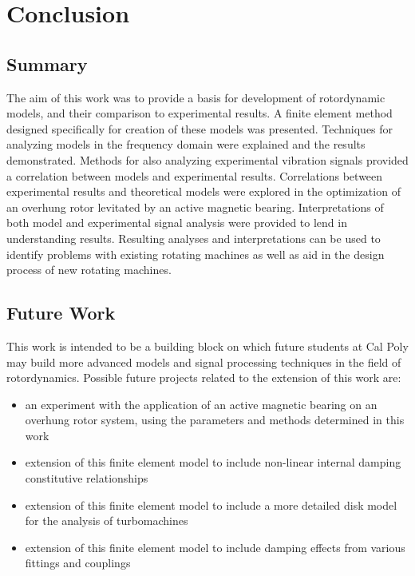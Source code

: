 \chapter{Conclusion}\label{conclusion}
\section{Summary}
The aim of this work was to provide a basis for development of rotordynamic models, and their comparison to experimental results. A finite element method designed specifically for creation of these models was presented. Techniques for analyzing models in the frequency domain were explained and the results demonstrated. Methods for also analyzing experimental vibration signals provided a correlation between models and experimental results. Correlations between experimental results and theoretical models were explored in the optimization of an overhung rotor levitated by an active magnetic bearing. Interpretations of both model and experimental signal analysis were provided to lend in understanding results. Resulting analyses and interpretations can be used to identify problems with existing rotating machines as well as aid in the design process of new rotating machines.\par
\section{Future Work}
This work is intended to be a building block on which future students at Cal Poly may build more advanced models and signal processing techniques in the field of rotordynamics. Possible future projects related to the extension of this work are:
\begin{itemize}
	\item an experiment with the application of an active magnetic bearing on an overhung rotor system, using the parameters and methods determined in this work
	\item extension of this finite element model to include non-linear internal damping constitutive relationships
	\item extension of this finite element model to include a more detailed disk model for the analysis of turbomachines
	\item extension of this finite element model to include damping effects from various fittings and couplings
\end{itemize}
